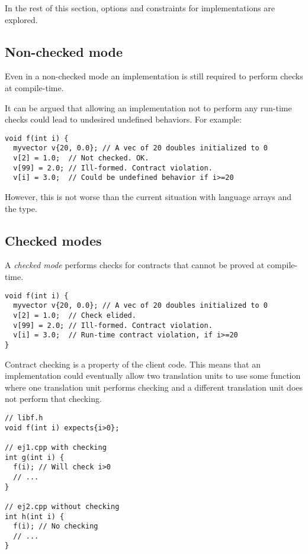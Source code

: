 In the rest of this section, options and constraints for implementations are explored.

\subsection{Non-checked mode}

Even in a non-checked mode an implementation is 
still required to perform checks at compile-time.

It can be argued that allowing an implementation not to perform any run-time
checks could lead to undesired undefined behaviors. For example:

\begin{lstlisting}
void f(int i) {
  myvector v{20, 0.0}; // A vec of 20 doubles initialized to 0
  v[2] = 1.0;  // Not checked. OK.
  v[99] = 2.0; // Ill-formed. Contract violation.
  v[i] = 3.0;  // Could be undefined behavior if i>=20
\end{lstlisting}

However, this is not worse than the current situation with language arrays and
the  type.

\subsection{Checked modes}

A \emph{checked mode} performs checks for contracts that cannot be
proved at compile-time.

\begin{lstlisting}
void f(int i) {
  myvector v{20, 0.0}; // A vec of 20 doubles initialized to 0
  v[2] = 1.0;  // Check elided.
  v[99] = 2.0; // Ill-formed. Contract violation.
  v[i] = 3.0;  // Run-time contract violation, if i>=20
}
\end{lstlisting}

Contract checking is a property of the client code. This means that an
implementation could eventually allow two translation units to use some
function where one translation unit performs checking and a different
translation unit does not perform that checking.

\begin{lstlisting}
// libf.h
void f(int i) expects{i>0};

// ej1.cpp with checking
int g(int i) {
  f(i); // Will check i>0
  // ...
}

// ej2.cpp without checking
int h(int i) {
  f(i); // No checking
  // ...
} 
\end{lstlisting}

